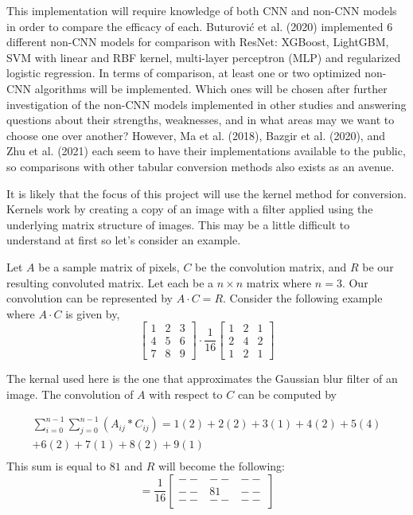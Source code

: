 \documentclass[10pt,twocolumn]{article}
\begin{document}
This implementation will require knowledge of both CNN and non-CNN models in order to compare the efficacy of each. Buturovi{\'c} et al. (2020) implemented 6 different non-CNN models for comparison with ResNet: XGBoost, LightGBM, SVM with linear and RBF kernel, multi-layer perceptron (MLP) and regularized logistic regression. In terms of comparison, at least one or two optimized non-CNN algorithms will be implemented. Which ones will be chosen after further investigation of the non-CNN models implemented in other studies and answering questions about their strengths, weaknesses, and in what areas may we want to choose one over another? However, Ma et al. (2018), Bazgir et al. (2020), and Zhu et al. (2021) each seem to have their implementations available to the public, so comparisons with other tabular conversion methods also exists as an avenue.

It is likely that the focus of this project will use the kernel method for conversion. Kernels work by creating a copy of an image with a filter applied using the underlying matrix structure of images. This may be a little difficult to understand at first so let’s consider an example.

Let $A$ be a sample matrix of pixels, $C$ be the convolution matrix, and $R$ be our resulting convoluted matrix. Let each be a $n \times n$ matrix where $n = 3$. Our convolution can be represented by $A \cdot C = R$. Consider the following example where $A \cdot C$ is given by,
\[
    \begin{bmatrix}
      1 & 2 & 3 \\
      4 & 5 & 6 \\
      7 & 8 & 9
    \end{bmatrix}
    \cdot
    \frac{1}{16}
    \begin{bmatrix}
      1 & 2 & 1 \\
      2 & 4 & 2 \\
      1 & 2 & 1
    \end{bmatrix}\]

The kernal used here is the one that approximates the Gaussian blur filter of an image. The convolution of $A$ with respect to $C$ can be computed by

\begin{multline*}
    \sum_{i=0}^{n-1}\sum_{j=0}^{n-1} (A_{ij}*C_{ij}) = 1(2) + 2(2) + 3(1) + 4(2) + 5(4) \\
    + 6(2) + 7(1) + 8(2) + 9(1) \\
\end{multline*}
This sum is equal to $81$ and $R$ will become the following:
\[
    =
    \frac{1}{16}
    \begin{bmatrix}
      -- & -- & -- \\
      -- & 81 & -- \\
      -- & -- & --
    \end{bmatrix}
\]
\end{document}
